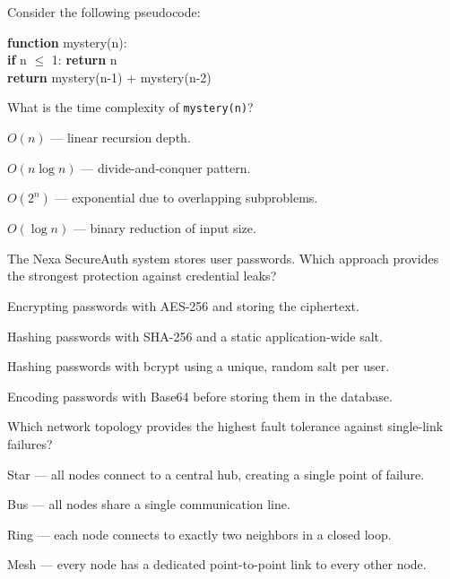 \documentclass[11pt,a4paper]{article}
\begin{document}
\begin{questionblock}
 Consider the following pseudocode:
\vspace{4pt}
{\centering\ttfamily\small
\textbf{function} mystery(n):\\
\quad \textbf{if} n $\le$ 1: \textbf{return} n\\
\quad \textbf{return} mystery(n-1) + mystery(n-2)
\par}
\vspace{2pt}
\noindent What is the time complexity of \texttt{mystery(n)}?
\begin{mcoptions}
  \item[\textbf{A.}] $O(n)$ --- linear recursion depth.
  \item[\textbf{B.}] $O(n \log n)$ --- divide-and-conquer pattern.
  \item[\textbf{C.}] $O(2^n)$ --- exponential due to overlapping subproblems.
  \item[\textbf{D.}] $O(\log n)$ --- binary reduction of input size.
\end{mcoptions}
\end{questionblock}

\begin{questionblock}
 The Nexa SecureAuth system stores user passwords. Which approach provides the strongest protection against credential leaks?
\begin{mcoptions}
  \item[\textbf{A.}] Encrypting passwords with AES-256 and storing the ciphertext.
  \item[\textbf{B.}] Hashing passwords with SHA-256 and a static application-wide salt.
  \item[\textbf{C.}] Hashing passwords with bcrypt using a unique, random salt per user.
  \item[\textbf{D.}] Encoding passwords with Base64 before storing them in the database.
\end{mcoptions}
\end{questionblock}

\begin{questionblock}
 Which network topology provides the highest fault tolerance against single-link failures?
\begin{mcoptions}
  \item[\textbf{A.}] Star --- all nodes connect to a central hub, creating a single point of failure.
  \item[\textbf{B.}] Bus --- all nodes share a single communication line.
  \item[\textbf{C.}] Ring --- each node connects to exactly two neighbors in a closed loop.
  \item[\textbf{D.}] Mesh --- every node has a dedicated point-to-point link to every other node.
\end{mcoptions}
\end{questionblock}
\end{document}
